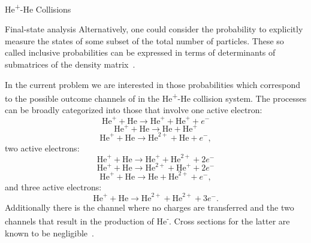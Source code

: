 \documentclass[a5paper, 9 pt]{extreport}
\begin{document}
\begin{chapter}{\texorpdfstring{He\textsuperscript{+}}{He+}-He Collisions \label{chap:hephe}}
\begin{section}{Final-state analysis \label{sec:hephe-det}}
      Alternatively, one could consider the probability to explicitly measure the states of some subset
      of the total number of particles. These so called inclusive probabilities can be expressed in
      terms of determinants of submatrices of the density matrix~\cite{inc-prob}.

      In the current problem we are interested in those probabilities which correspond to the possible
      outcome channels of in the He\textsuperscript{+}-He collision system. The processes can be broadly
      categorized into those that involve one active electron:
      \begin{equation} \label{eq:tpi111}
         \mathrm{He}^+ + \mathrm{He} \rightarrow \mathrm{He}^+ + \mathrm{He}^+ + e^-
      \end{equation}
      \begin{equation} \label{eq:tpi120}
         \mathrm{He}^+ + \mathrm{He} \rightarrow \mathrm{He} + \mathrm{He}^+
      \end{equation}
      \begin{equation} \label{eq:tpi201}
         \mathrm{He}^+ + \mathrm{He} \rightarrow \mathrm{He}^{2+} + \mathrm{He} + e^-,
      \end{equation}
      two active electrons:
      \begin{equation} \label{eq:tpi012}
         \mathrm{He}^+ + \mathrm{He} \rightarrow \mathrm{He}^+ + \mathrm{He}^{2+} + 2e^-
      \end{equation}
      \begin{equation} \label{eq:tpi102}
         \mathrm{He}^+ + \mathrm{He} \rightarrow \mathrm{He}^{2+} + \mathrm{He}^+ + 2e^-
      \end{equation}
      \begin{equation} \label{eq:tpi021}
         \mathrm{He}^+ + \mathrm{He} \rightarrow \mathrm{He} + \mathrm{He}^{2+} + e^-,
      \end{equation}
      and three active electrons:
      \begin{equation} \label{eq:tpi003}
         \mathrm{He}^+ + \mathrm{He} \rightarrow \mathrm{He}^{2+} + \mathrm{He}^{2+} + 3e^{-}.
      \end{equation}
      Additionally there is the channel where no charges are transferred and the two channels that result
      in the production of He\textsuperscript{-}. Cross sections for the latter are known to be
      negligible~\cite{metahe, neghe-neg}.


\end{section}
\end{chapter}
\end{document}

